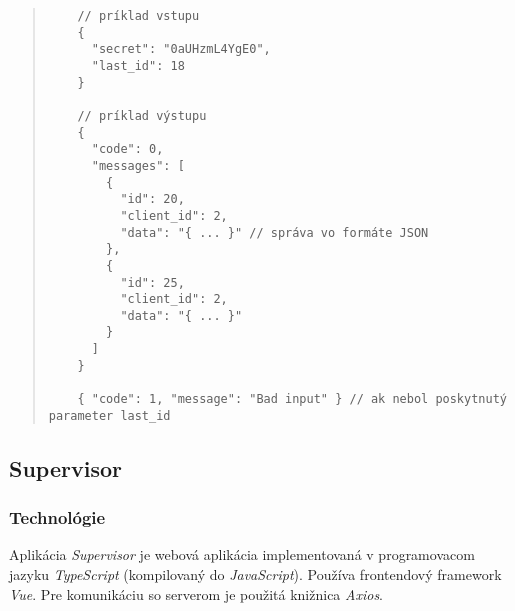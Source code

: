 \documentclass{article}
\begin{document}
\begin{quote}
  \begin{verbatim}
    // príklad vstupu
    {
      "secret": "0aUHzmL4YgE0",
      "last_id": 18
    }

    // príklad výstupu
    { 
      "code": 0,
      "messages": [
        {
          "id": 20,
          "client_id": 2,
          "data": "{ ... }" // správa vo formáte JSON
        },
        {
          "id": 25,
          "client_id": 2,
          "data": "{ ... }"
        }
      ]
    }

    { "code": 1, "message": "Bad input" } // ak nebol poskytnutý parameter last_id
  \end{verbatim}
  

\end{quote}

\subsection{Supervisor}

\subsubsection{Technológie}
Aplikácia \emph{Supervisor} je webová aplikácia implementovaná v programovacom jazyku \emph{TypeScript} (kompilovaný do \emph{JavaScript}). Používa frontendový framework \emph{Vue}. Pre komunikáciu so serverom je použitá knižnica \emph{Axios}.
\end{document}
